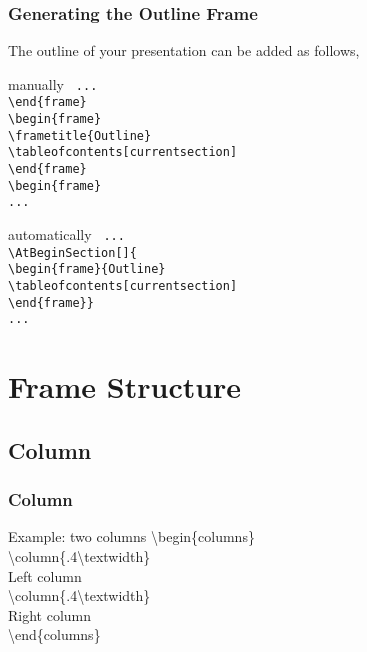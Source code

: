 \documentclass[article]{beamer}
\begin{document}
\begin{frame}[fragile]
\frametitle{Generating the Outline Frame}

The outline of your presentation can be added as follows,\\

\begin{block}{manually}
\scriptsize{\tt{
...\\
\textbackslash end\{frame\}\\
\vspace{0.1cm}
\textbackslash begin\{frame\}\\
\textbackslash frametitle\{Outline\}\\
\textbackslash tableofcontents[currentsection]\\
\textbackslash end\{frame\}\\
\vspace{0.2cm}
\textbackslash begin\{frame\}\\
...\\
}}
\end{block}

\begin{block}{automatically}
\scriptsize{\tt{
...\\
\textbackslash AtBeginSection[]\{\\
\textbackslash begin\{frame\}\{Outline\}\\
\textbackslash tableofcontents[currentsection]\\
\textbackslash end\{frame\}\}\\
...\\
}}
\end{block}
\end{frame}


\section{Frame Structure}
\subsection{Column}


\begin{frame}[fragile]
\frametitle{Column}
\begin{block}{Example: two columns}\scriptsize{
\textbackslash begin\{columns\}\\
\textbackslash column\{.4\textbackslash textwidth\}\\
Left column\\
\textbackslash column\{.4\textbackslash textwidth\}\\
Right column\\
\textbackslash end\{columns\}\\
}
\end{block}
\vspace{1cm}
\end{frame}
\end{document}
